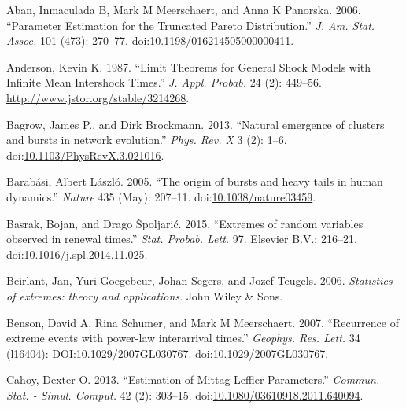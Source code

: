 \documentclass[smallextended]{svjour3}       %
\begin{document}




\hypertarget{refs}{}
\hypertarget{ref-Aban06}{}
Aban, Inmaculada B, Mark M Meerschaert, and Anna K Panorska. 2006.
``Parameter Estimation for the Truncated Pareto Distribution.'' \emph{J.
Am. Stat. Assoc.} 101 (473): 270--77.
doi:\href{https://doi.org/10.1198/016214505000000411}{10.1198/016214505000000411}.

\hypertarget{ref-Anderson1987}{}
Anderson, Kevin K. 1987. ``Limit Theorems for General Shock Models with
Infinite Mean Intershock Times.'' \emph{J. Appl. Probab.} 24 (2):
449--56. \url{http://www.jstor.org/stable/3214268}.

\hypertarget{ref-Bagrow2013}{}
Bagrow, James P., and Dirk Brockmann. 2013. ``Natural emergence of
clusters and bursts in network evolution.'' \emph{Phys. Rev. X} 3 (2):
1--6.
doi:\href{https://doi.org/10.1103/PhysRevX.3.021016}{10.1103/PhysRevX.3.021016}.

\hypertarget{ref-Barabasi2005}{}
Barabási, Albert László. 2005. ``The origin of bursts and heavy tails in
human dynamics.'' \emph{Nature} 435 (May): 207--11.
doi:\href{https://doi.org/10.1038/nature03459}{10.1038/nature03459}.

\hypertarget{ref-Basrak2014}{}
Basrak, Bojan, and Drago Špoljarić. 2015. ``Extremes of random variables
observed in renewal times.'' \emph{Stat. Probab. Lett.} 97. Elsevier
B.V.: 216--21.
doi:\href{https://doi.org/10.1016/j.spl.2014.11.025}{10.1016/j.spl.2014.11.025}.

\hypertarget{ref-beirlantBook}{}
Beirlant, Jan, Yuri Goegebeur, Johan Segers, and Jozef Teugels. 2006.
\emph{Statistics of extremes: theory and applications}. John Wiley \&
Sons.

\hypertarget{ref-Benson2007}{}
Benson, David A, Rina Schumer, and Mark M Meerschaert. 2007.
``Recurrence of extreme events with power-law interarrival times.''
\emph{Geophys. Res. Lett.} 34 (l16404): DOI:10.1029/2007GL030767.
doi:\href{https://doi.org/10.1029/2007GL030767}{10.1029/2007GL030767}.

\hypertarget{ref-Cahoy2013}{}
Cahoy, Dexter O. 2013. ``Estimation of Mittag-Leffler Parameters.''
\emph{Commun. Stat. - Simul. Comput.} 42 (2): 303--15.
doi:\href{https://doi.org/10.1080/03610918.2011.640094}{10.1080/03610918.2011.640094}.
\end{document}

